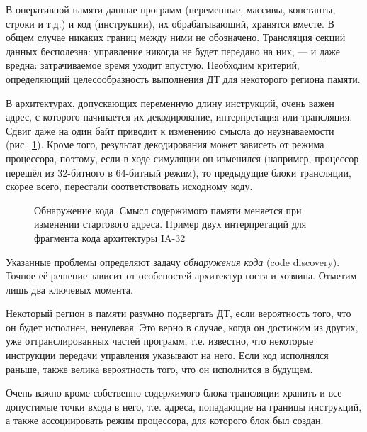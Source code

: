 \begin{itemize*}
    \item В оперативной памяти данные программ (переменные, массивы, константы, строки и т.д.) и код (инструкции), их обрабатывающий, хранятся вместе. В общем случае никаких границ между ними не обозначено. Трансляция секций данных бесполезна: управление никогда не будет передано на них, --- и даже вредна: затрачиваемое время уходит впустую. Необходим критерий, определяющий целесообразность выполнения ДТ для некоторого региона памяти.
    
    \item В архитектурах, допускающих переменную длину инструкций, очень важен адрес, с которого начинается их декодирование, интерпретация или трансляция. Сдвиг даже на один байт приводит к изменению смысла до неузнаваемости (рис.~\ref{fig:byte-shift}). Кроме того, результат декодирования может зависеть от режима процессора, поэтому, если в ходе симуляции он изменился (например, процессор перешёл из 32-битного в 64-битный режим), то предыдущие блоки трансляции, скорее всего, перестали соответствовать исходному коду.
\end{itemize*}

\begin{figure}[htb]
    \centering
    \caption[Обнаружение кода]{Обнаружение кода. Смысл содержимого памяти меняется при изменении стартового адреса. Пример двух интерпретаций для фрагмента кода архитектуры IA-32}
    \label{fig:byte-shift}
\end{figure}

Указанные проблемы определяют задачу \textit{обнаружения кода} (\abbr code discovery). Точное её решение зависит от особеностей архитектур гостя и хозяина. Отметим лишь два ключевых момента.

\begin{itemize*}
    \item Некоторый регион в памяти разумно подвергать ДТ, если вероятность того, что он будет исполнен, ненулевая. Это верно в случае, когда он достижим из других, уже оттранслированных частей программ, т.е. известно, что некоторые инструкции передачи управления указывают на него. Если код исполнялся раньше, также велика вероятность того, что он исполнится в будущем.
    \item Очень важно кроме собственно содержимого блока трансляции хранить и все допустимые точки входа в него, т.е. адреса, попадающие на границы инструкций, а также ассоциировать режим процессора, для которого блок был создан.
\end{itemize*}

